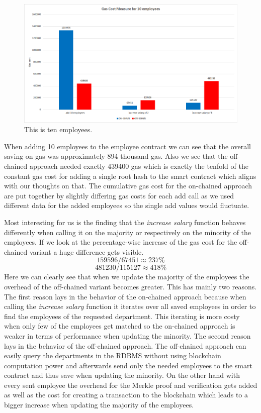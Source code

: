 \begin{figure}[t]%
\centering
\includegraphics[width=1.0\textwidth]{images/05_evaluation/05_gas_cost_ten.png}
\caption{\label{fig:05_gas_cost_ten}This is ten employees.}
\end{figure}

When adding 10 employees to the employee contract we can see that the overall saving on gas was approximately 894 thousand gas. Also we see that the off-chained approach needed exactly 439400 gas which is exactly the tenfold of the constant gas cost for adding a single root hash to the smart contract which aligns with our thoughts on that. The cumulative gas cost for the on-chained approach are put together by slightly differing gas costs for each add call as we used different data for the added employees so the single add values would fluctuate.

Most interesting for us is the finding that the \textit{increase salary} function behaves differently when calling it on the majority or respectively on the minority of the employees. If we look at the percentage-wise increase of the gas cost for the off-chained variant a huge difference gets visible.
$$ 159596 / 67451 \approx 237\% $$
$$ 481230 / 115127 \approx 418\% $$
Here we can clearly see that when we update the majority of the employees the overhead of the off-chained variant becomes greater. This has mainly two reasons. The first reason lays in the behavior of the on-chained approach because when calling the \textit{increase salary} function it iterates over all saved employees in order to find the employees of the requested department. This iterating is more costy when only few of the employees get matched so the on-chained approach is weaker in terms of performance when updating the minority. The second reason lays in the behavior of the off-chained approach. The off-chained approach can easily query the departments in the RDBMS without using blockchain computation power and afterwards send only the needed employees to the smart contract and thus save when updating the minority. On the other hand with every sent employee the overhead for the Merkle proof and verification gets added as well as the cost for creating a transaction to the blockchain which leads to a bigger increase when updating the majority of the employees.

